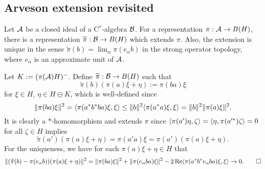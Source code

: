\documentclass{../../small}
\begin{document}
\subsection{Arveson extension revisited}

\begin{prop}
Let $\mathcal{A}$ be a closed ideal of a C$^*$-algebra $\mathcal{B}$.
For a representation $\pi:\mathcal{A}\to B(H)$, there is a representation $\widetilde\pi:\mathcal{B}\to B(H)$ which extends $\pi$.
Also, the extension is unique in the sense $\tilde\pi(b)=\lim_\alpha\pi(e_\alpha b)$ in the strong operator topology, where $e_\alpha$ is an approximate unit of $\mathcal{A}$.
\end{prop}
\begin{pf}
Let $K:=(\pi(\mathcal{A})H)^-$.
Define $\widetilde\pi:\mathcal{B}\to B(H)$ such that
\[\tilde\pi(b)(\pi(a)\xi+\eta):=\pi(ba)\xi\]
for $\xi\in H$, $\eta\in H\ominus K$, which is well-defined since
\[\|\pi(ba)\xi\|^2=\langle\pi(a^*b^*ba)\xi,\xi\rangle\le\|b\|^2\langle\pi(a^*a)\xi,\xi\rangle=\|b\|^2\|\pi(a)\xi\|^2.\]
It is clearly a $*$-homomorphism and extends $\pi$ since $\langle\pi(a')\eta,\zeta\rangle=\langle\eta,\pi(a'^*)\zeta\rangle=0$ for all $\zeta\in H$ implies
\[\tilde\pi(a')(\pi(a)\xi+\eta)=\pi(a'a)\xi=\pi(a')(\pi(a)\xi+\eta).\]
For the uniqueness, we have for each $\pi(a)\xi+\eta\in H$ that
\[\|(\widetilde\pi(b)-\pi(e_\alpha b))(\pi(a)\xi+\eta)\|^2=\|\pi(ba)\xi\|^2+\|\pi(e_\alpha ba)\xi\|^2-2\operatorname{Re}\langle\pi(a^*b^*e_\alpha ba)\xi,\xi\rangle\to0.\qedhere\]
\end{pf}
\end{document}
